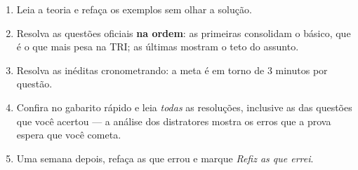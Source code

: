 
\begin{dica}
\begin{enumerate}[leftmargin=1.4em,itemsep=1pt,topsep=0pt]
  \item Leia a teoria e refaça os exemplos sem olhar a solução.
  \item Resolva as questões oficiais \textbf{na ordem}: as primeiras consolidam o básico, que é o que
        mais pesa na TRI; as últimas mostram o teto do assunto.
  \item Resolva as inéditas cronometrando: a meta é em torno de 3 minutos por questão.
  \item Confira no gabarito rápido e leia \emph{todas} as resoluções, inclusive as das questões que
        você acertou — a análise dos distratores mostra os erros que a prova espera que você cometa.
  \item Uma semana depois, refaça as que errou e marque \emph{Refiz as que errei}.
\end{enumerate}
\end{dica}
